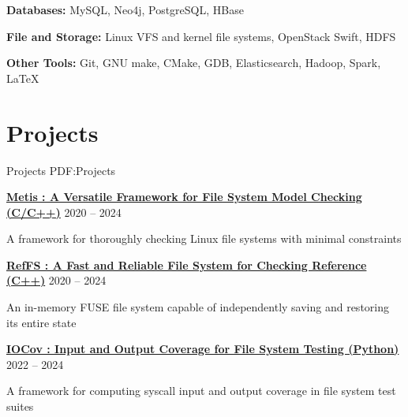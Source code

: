 \documentclass[a4paper,10pt,oneside]{article}
\begin{document}
\begin{body}
\BulletItem
\textbf{Databases:} MySQL, Neo4j, PostgreSQL, HBase

\GapNoBreak

\BulletItem
\textbf{File and Storage:} Linux VFS and kernel file systems, OpenStack Swift, HDFS


\GapNoBreak

\BulletItem
\textbf{Other Tools:} Git, GNU make, CMake, GDB, Elasticsearch, Hadoop, Spark, {\LaTeX}


\GapNoBreak

\section
{Projects}
{Projects}
{PDF:Projects}

\href{https://github.com/sbu-fsl/Metis}
{\textbf{Metis : A Versatile Framework for File System Model Checking (C/C++)}}
\hfill
2020 -- 
2024

\BulletItem
A framework for thoroughly checking Linux file systems with minimal constraints

\href{https://github.com/sbu-fsl/RefFS}
{\textbf{RefFS : A Fast and Reliable File System for Checking Reference (C++)}}
\hfill
2020 -- 
2024

\BulletItem
An in-memory FUSE file system capable of independently saving and restoring its entire state

\href{https://github.com/sbu-fsl/IOCov}
{\textbf{IOCov : Input and Output Coverage for File System Testing (Python)}}
\hfill
2022 -- 
2024

\BulletItem
A framework for computing syscall input and output coverage in file system test suites





\end{body}
\end{document}
